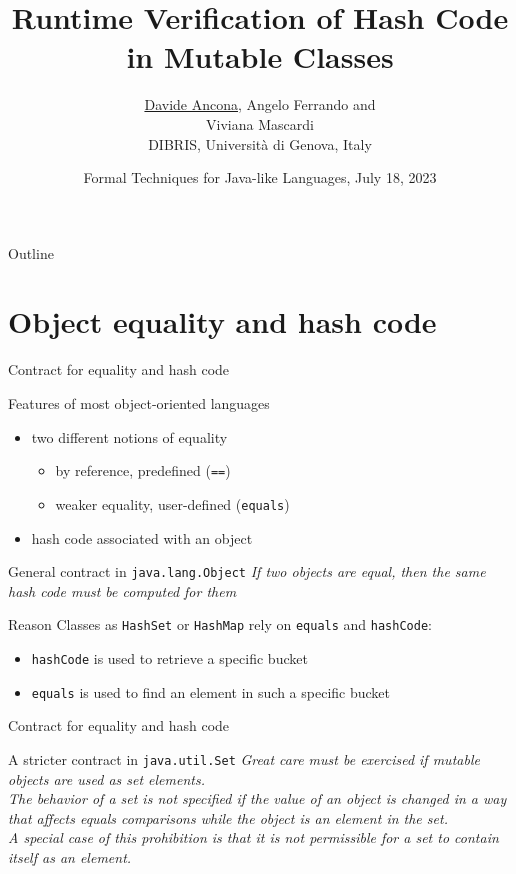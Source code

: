 \documentclass[10pt,usenames,dvipsnames]{beamer}
\title[Runtime Verification of Hash Code in Mutable Classes]{Runtime Verification of Hash Code in Mutable Classes}
\author[D. Ancona]{\underline{Davide Ancona}, Angelo Ferrando and \\ Viviana Mascardi \\[1ex]
  \small DIBRIS, Universit\`a di Genova, Italy}
\institute[]{DIBRIS, Universit\`a di Genova, Italy}
\date[FTfJP23]{Formal Techniques for Java-like Languages, July 18, 2023}
\begin{document}

\begin{frame}{Outline}
\tableofcontents%
\end{frame}

\section{Object equality and hash code}

\begin{frame}{Contract for equality and hash code}
  \begin{block}{Features of most object-oriented languages}
    \begin{itemize}
    \item two different notions of equality
      \begin{itemize}
      \item by reference, predefined (\lstinline{==})
      \item weaker equality, user-defined (\lstinline{equals})
      \end{itemize}
      \item hash code associated with an object
    \end{itemize}
  \end{block}

  \begin{block}{General contract in \lstinline[basicstyle=\ttfamily\large]{java.lang.Object}}
    \emph{If two objects are equal, then the same hash code must be computed for them}
  \end{block}

    \begin{block}{Reason}
      Classes as \lstinline{HashSet} or \lstinline{HashMap} rely on \lstinline{equals} and \lstinline{hashCode}:
      \begin{itemize}
      \item \lstinline{hashCode} is used to retrieve a specific bucket
      \item \lstinline{equals} is used to find an element in such a specific bucket        
        \end{itemize}
  \end{block}

\end{frame}


\begin{frame}{Contract for equality and hash code}
  \begin{block}{A stricter contract in \lstinline{java.util.Set}}
    \emph{Great care must be exercised if mutable objects are used as set elements.}\\[1ex]
    \emph{The behavior of a set is not specified if the value of an object is changed in a way that affects equals comparisons while the object is an element in the set.} \\[1ex]
    \emph{A special case of this prohibition is that it is not permissible for a set to contain itself as an element.} 
  \end{block}
\end{frame}
\end{document}
